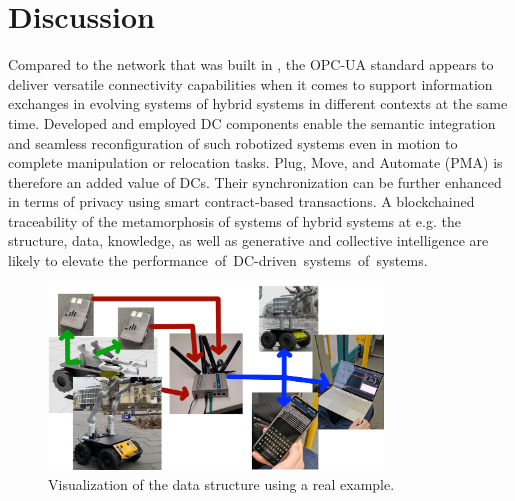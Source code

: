 \documentclass[conference]{IEEEtran}
\begin{document}
\section{Discussion}
Compared to the network that was built in \cite{SotaCAN}, the OPC-UA standard appears to deliver versatile connectivity capabilities when it comes to support information exchanges in evolving systems of hybrid systems in different contexts at the same time. Developed and employed DC components enable the  semantic integration and  seamless reconfiguration of such robotized systems even in motion to complete manipulation or relocation tasks. Plug, Move, and Automate (PMA) is therefore an added value of DCs. Their synchronization can be further enhanced in terms of privacy using smart contract-based transactions. A blockchained traceability of the metamorphosis of systems of hybrid systems at e.g. the structure, data, knowledge, as well as generative and collective intelligence are likely to elevate the \mbox{performance of DC-driven systems of systems.}

\begin{figure}[b]
	\centerline{\includegraphics[width=8.9cm]{Pictures/AufbauBilder.png}}
	\caption{Visualization of the data structure using a real example.}
	\label{fig:AufbauBilder}
\end{figure}

\end{document}
